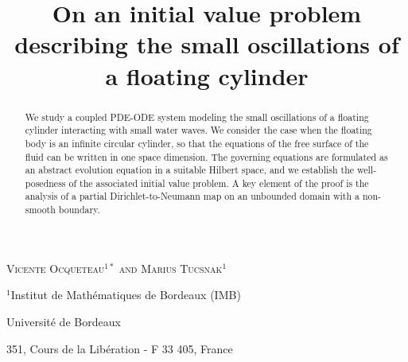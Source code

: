 \documentclass{amsart} %
\title[Small oscillations of a floating cylinder]
{On an initial value problem describing the small oscillations of a floating cylinder} %
\author[Vicente Ocqueteau and Marius Tucsnak]{}
\numberwithin{equation}{section}
\theoremstyle{definition}
\begin{document}
\maketitle

\centerline{\scshape
Vicente Ocqueteau$^{1*}$
and Marius Tucsnak$^1$}

\medskip

{\footnotesize
 \centerline{$^1$Institut de Math\'ematiques de Bordeaux (IMB)}
 \centerline{Universit\'e de Bordeaux}
 \centerline{351, Cours de la Lib\'eration - F 33 405, France}

} %

\medskip


\bigskip


\begin{abstract}
We study a coupled PDE-ODE system modeling the small oscillations of a floating cylinder interacting with small water waves. 
We consider the case when the floating body is an infinite circular cylinder, so that the equations of the free surface
of the fluid can be written in one space dimension.
The governing equations are formulated as an abstract evolution equation in a suitable Hilbert space, and we establish the well-posedness of the associated initial value problem. A key element of the proof is the analysis of a partial Dirichlet-to-Neumann map on an unbounded domain with a non-smooth boundary.
\end{abstract}

\end{document}

